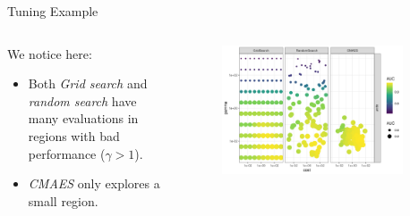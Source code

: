 \begin{frame}{Tuning Example}

\begin{columns}
\begin{column}{0.45\textwidth}
  \vspace{1em}

  We notice here:

  \begin{itemize}
      \item Both \emph{Grid search} and \emph{random search} have many evaluations in regions with bad performance ($\gamma>1$).
    \item \emph{CMAES} only explores a small region.
  \end{itemize}
\end{column}%
\begin{column}{0.5\textwidth}
  \vspace{-1em}
  \begin{figure}
  \includegraphics[width=0.9\textwidth]{images/benchmark_scatter.png}
  \end{figure}
\end{column}
\end{columns}

\end{frame}
